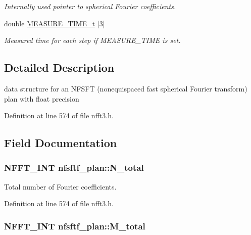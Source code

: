 \begin{DoxyCompactItemize}
\begin{DoxyCompactList}\small\item\em Internally used pointer to spherical Fourier coefficients. \end{DoxyCompactList}\item 
\hypertarget{structnfsftf__plan_af36dbcf3d4f12bb85ac6c167aabf8768}{double \hyperlink{structnfsftf__plan_af36dbcf3d4f12bb85ac6c167aabf8768}{M\-E\-A\-S\-U\-R\-E\-\_\-\-T\-I\-M\-E\-\_\-t} \mbox{[}3\mbox{]}}\label{structnfsftf__plan_af36dbcf3d4f12bb85ac6c167aabf8768}

\begin{DoxyCompactList}\small\item\em Measured time for each step if M\-E\-A\-S\-U\-R\-E\-\_\-\-T\-I\-M\-E is set. \end{DoxyCompactList}\end{DoxyCompactItemize}


\subsection{Detailed Description}
data structure for an N\-F\-S\-F\-T (nonequispaced fast spherical Fourier transform) plan with float precision 

Definition at line 574 of file nfft3.\-h.



\subsection{Field Documentation}
\hypertarget{structnfsftf__plan_a2f04edb65331f44c28ac8cc2f085ddfc}{
\subsubsection[{N\-\_\-total}]{\setlength{\rightskip}{0pt plus 5cm}N\-F\-F\-T\-\_\-\-I\-N\-T nfsftf\-\_\-plan\-::\-N\-\_\-total}}\label{structnfsftf__plan_a2f04edb65331f44c28ac8cc2f085ddfc}


Total number of Fourier coefficients. 



Definition at line 574 of file nfft3.\-h.

\hypertarget{structnfsftf__plan_a0ff9eee8adb478327be54a97ed113e63}{
\subsubsection[{M\-\_\-total}]{\setlength{\rightskip}{0pt plus 5cm}N\-F\-F\-T\-\_\-\-I\-N\-T nfsftf\-\_\-plan\-::\-M\-\_\-total}}\label{structnfsftf__plan_a0ff9eee8adb478327be54a97ed113e63}


